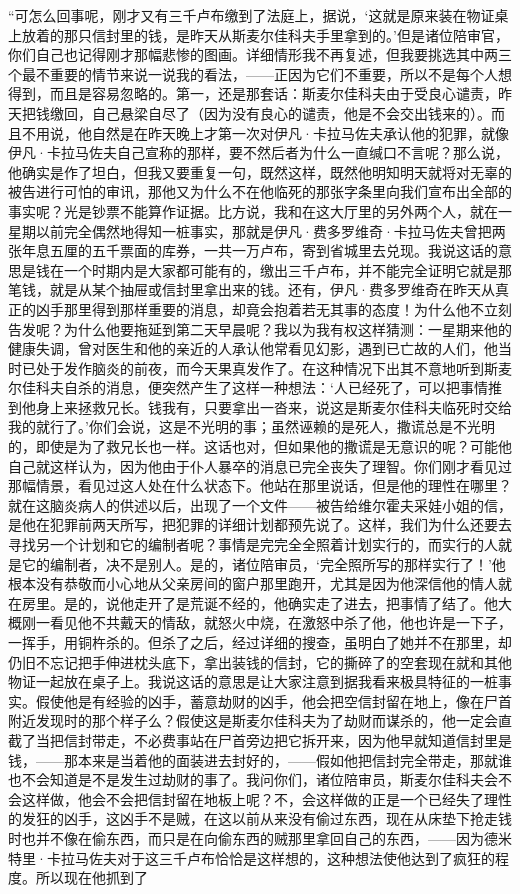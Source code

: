 \par “可怎么回事呢，刚才又有三千卢布缴到了法庭上，据说，‘这就是原来装在物证桌上放着的那只信封里的钱，是昨天从斯麦尔佳科夫手里拿到的。’但是诸位陪审官，你们自己也记得刚才那幅悲惨的图画。详细情形我不再复述，但我要挑选其中两三个最不重要的情节来说一说我的看法，——正因为它们不重要，所以不是每个人想得到，而且是容易忽略的。第一，还是那套话：斯麦尔佳科夫由于受良心谴责，昨天把钱缴回，自己悬梁自尽了（因为没有良心的谴责，他是不会交出钱来的）。而且不用说，他自然是在昨天晚上才第一次对伊凡·卡拉马佐夫承认他的犯罪，就像伊凡·卡拉马佐夫自己宣称的那样，要不然后者为什么一直缄口不言呢？那么说，他确实是作了坦白，但我又要重复一句，既然这样，既然他明知明天就将对无辜的被告进行可怕的审讯，那他又为什么不在他临死的那张字条里向我们宣布出全部的事实呢？光是钞票不能算作证据。比方说，我和在这大厅里的另外两个人，就在一星期以前完全偶然地得知一桩事实，那就是伊凡·费多罗维奇·卡拉马佐夫曾把两张年息五厘的五千票面的库券，一共一万卢布，寄到省城里去兑现。我说这话的意思是钱在一个时期内是大家都可能有的，缴出三千卢布，并不能完全证明它就是那笔钱，就是从某个抽屉或信封里拿出来的钱。还有，伊凡·费多罗维奇在昨天从真正的凶手那里得到那样重要的消息，却竟会抱着若无其事的态度！为什么他不立刻告发呢？为什么他要拖延到第二天早晨呢？我以为我有权这样猜测：一星期来他的健康失调，曾对医生和他的亲近的人承认他常看见幻影，遇到已亡故的人们，他当时已处于发作脑炎的前夜，而今天果真发作了。在这种情况下出其不意地听到斯麦尔佳科夫自杀的消息，便突然产生了这样一种想法：‘人已经死了，可以把事情推到他身上来拯救兄长。钱我有，只要拿出一沓来，说这是斯麦尔佳科夫临死时交给我的就行了。’你们会说，这是不光明的事；虽然诬赖的是死人，撒谎总是不光明的，即使是为了救兄长也一样。这话也对，但如果他的撒谎是无意识的呢？可能他自己就这样认为，因为他由于仆人暴卒的消息已完全丧失了理智。你们刚才看见过那幅情景，看见过这人处在什么状态下。他站在那里说话，但是他的理性在哪里？就在这脑炎病人的供述以后，出现了一个文件——被告给维尔霍夫采娃小姐的信，是他在犯罪前两天所写，把犯罪的详细计划都预先说了。这样，我们为什么还要去寻找另一个计划和它的编制者呢？事情是完完全全照着计划实行的，而实行的人就是它的编制者，决不是别人。是的，诸位陪审员，‘完全照所写的那样实行了！’他根本没有恭敬而小心地从父亲房间的窗户那里跑开，尤其是因为他深信他的情人就在房里。是的，说他走开了是荒诞不经的，他确实走了进去，把事情了结了。他大概刚一看见他不共戴天的情敌，就怒火中烧，在激怒中杀了他，他也许是一下子，一挥手，用铜杵杀的。但杀了之后，经过详细的搜查，虽明白了她并不在那里，却仍旧不忘记把手伸进枕头底下，拿出装钱的信封，它的撕碎了的空套现在就和其他物证一起放在桌子上。我说这话的意思是让大家注意到据我看来极具特征的一桩事实。假使他是有经验的凶手，蓄意劫财的凶手，他会把空信封留在地上，像在尸首附近发现时的那个样子么？假使这是斯麦尔佳科夫为了劫财而谋杀的，他一定会直截了当把信封带走，不必费事站在尸首旁边把它拆开来，因为他早就知道信封里是钱，——那本来是当着他的面装进去封好的，——假如他把信封完全带走，那就谁也不会知道是不是发生过劫财的事了。我问你们，诸位陪审员，斯麦尔佳科夫会不会这样做，他会不会把信封留在地板上呢？不，会这样做的正是一个已经失了理性的发狂的凶手，这凶手不是贼，在这以前从来没有偷过东西，现在从床垫下抢走钱时也并不像在偷东西，而只是在向偷东西的贼那里拿回自己的东西，——因为德米特里·卡拉马佐夫对于这三千卢布恰恰是这样想的，这种想法使他达到了疯狂的程度。所以现在他抓到了
